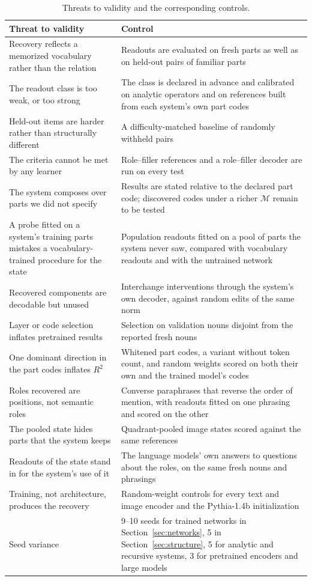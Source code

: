 \documentclass[10pt]{article}
\theoremstyle{plain}
\theoremstyle{remark}
\newcommand{\M}{\mathcal{M}}
\begin{document}
\begin{table}[t]
  \caption{Threats to validity and the corresponding controls.}
  \label{tab:controls}
  \centering\small
  \begin{tabularx}{\linewidth}{@{}YY@{}}
    \toprule
    Threat to validity & Control \\
    \midrule
    Recovery reflects a memorized vocabulary rather than the relation & Readouts are evaluated on fresh parts as well as on held-out pairs of familiar parts \\
    The readout class is too weak, or too strong & The class is declared in advance and calibrated on analytic operators and on references built from each system's own part codes \\
    Held-out items are harder rather than structurally different & A difficulty-matched baseline of randomly withheld pairs \\
    The criteria cannot be met by any learner & Role--filler references and a role--filler decoder are run on every test \\
    The system composes over parts we did not specify & Results are stated relative to the declared part code; discovered codes under a richer $\M$ remain to be tested \\
    A probe fitted on a system's training parts mistakes a vocabulary-trained procedure for the state & Population readouts fitted on a pool of parts the system never saw, compared with vocabulary readouts and with the untrained network \\
    Recovered components are decodable but unused & Interchange interventions through the system's own decoder, against random edits of the same norm \\
    Layer or code selection inflates pretrained results & Selection on validation nouns disjoint from the reported fresh nouns \\
    One dominant direction in the part codes inflates $R^2$ & Whitened part codes, a variant without token count, and random weights scored on both their own and the trained model's codes \\
    Roles recovered are positions, not semantic roles & Converse paraphrases that reverse the order of mention, with readouts fitted on one phrasing and scored on the other \\
    The pooled state hides parts that the system keeps & Quadrant-pooled image states scored against the same references \\
    Readouts of the state stand in for the system's use of it & The language models' own answers to questions about the roles, on the same fresh nouns and phrasings \\
    Training, not architecture, produces the recovery & Random-weight controls for every text and image encoder and the Pythia-1.4b initialization \\
    Seed variance & 9--10 seeds for trained networks in Section~\ref{sec:networks}, 5 in Section~\ref{sec:structure}, 5 for analytic and recursive systems, 3 for pretrained encoders and large models \\
    \bottomrule
  \end{tabularx}
\end{table}
\end{document}
